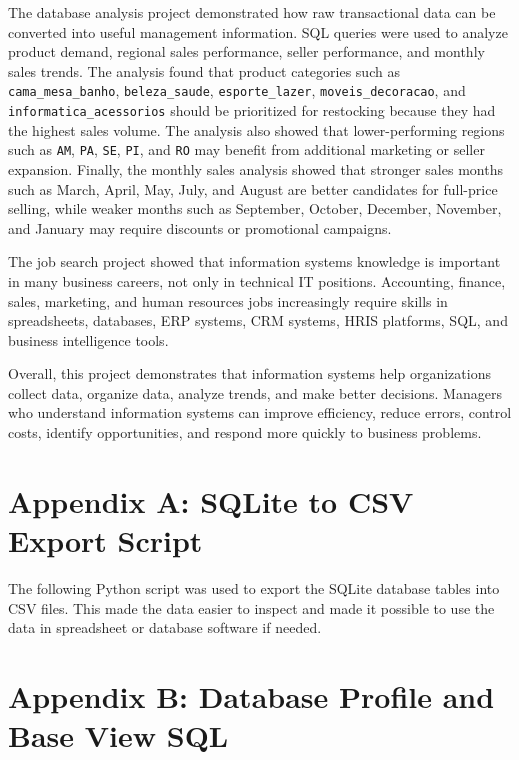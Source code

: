 \documentclass[12pt]{article}
\begin{document}
The database analysis project demonstrated how raw transactional data can be
converted into useful management information. SQL queries were used to analyze
product demand, regional sales performance, seller performance, and monthly sales
trends. The analysis found that product categories such as
\texttt{cama\_mesa\_banho}, \texttt{beleza\_saude}, \texttt{esporte\_lazer},
\texttt{moveis\_decoracao}, and \texttt{informatica\_acessorios} should be
prioritized for restocking because they had the highest sales volume. The
analysis also showed that lower-performing regions such as \texttt{AM},
\texttt{PA}, \texttt{SE}, \texttt{PI}, and \texttt{RO} may benefit from
additional marketing or seller expansion. Finally, the monthly sales analysis
showed that stronger sales months such as March, April, May, July, and August are
better candidates for full-price selling, while weaker months such as September,
October, December, November, and January may require discounts or promotional
campaigns.

The job search project showed that information systems knowledge is important in
many business careers, not only in technical IT positions. Accounting, finance,
sales, marketing, and human resources jobs increasingly require skills in
spreadsheets, databases, ERP systems, CRM systems, HRIS platforms, SQL, and
business intelligence tools.

Overall, this project demonstrates that information systems help organizations
collect data, organize data, analyze trends, and make better decisions. Managers
who understand information systems can improve efficiency, reduce errors, control
costs, identify opportunities, and respond more quickly to business problems.


\newpage
\appendix

\section{Appendix A: SQLite to CSV Export Script}

The following Python script was used to export the SQLite database tables into
CSV files. This made the data easier to inspect and made it possible to use the
data in spreadsheet or database software if needed.




\newpage
\section{Appendix B: Database Profile and Base View SQL}
\end{document}
